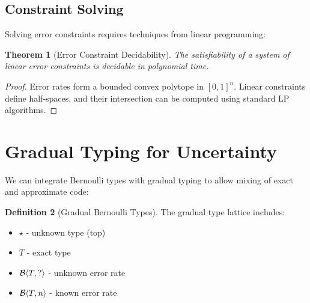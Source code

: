 \documentclass[11pt,twoside,openright]{book}
\theoremstyle{definition}
\newtheorem{definition}{Definition}[chapter]
\theoremstyle{plain}
\newtheorem{theorem}[definition]{Theorem}
\theoremstyle{remark}
\begin{document}
\begin{algorithm}[H]
\SetAlgoLined
{}
\caption{Type Inference with Error Constraints}
\end{algorithm}

\subsection{Constraint Solving}

Solving error constraints requires techniques from linear programming:

\begin{theorem}[Error Constraint Decidability]
The satisfiability of a system of linear error constraints is decidable in polynomial time.
\end{theorem}

\begin{proof}
Error rates form a bounded convex polytope in $[0,1]^n$. Linear constraints define half-spaces, and their intersection can be computed using standard LP algorithms.
\end{proof}

\section{Gradual Typing for Uncertainty}

We can integrate Bernoulli types with gradual typing to allow mixing of exact and approximate code:

\begin{definition}[Gradual Bernoulli Types]
The gradual type lattice includes:
\begin{itemize}
    \item $\star$ - unknown type (top)
    \item $T$ - exact type
    \item $\mathcal{B}\langle T, ? \rangle$ - unknown error rate
    \item $\mathcal{B}\langle T, n \rangle$ - known error rate
\end{itemize}
\end{definition}
\end{document}
